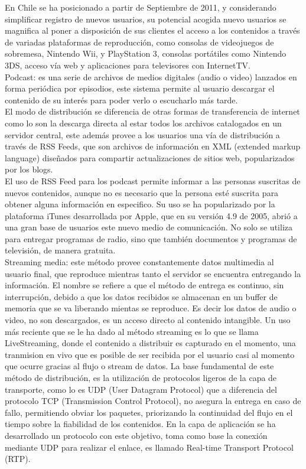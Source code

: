 En Chile se ha posicionado a partir de Septiembre de 2011, y considerando simplificar registro de nuevos usuarios, su potencial acogida nuevo usuarios se magnifica al poner a disposición de sus clientes el acceso a los contenidos a través de variadas plataformas de reproducción, como consolas de videojuegos de sobremesa, Nintendo Wii, y PlayStation 3, consolas portátiles como Nintendo 3DS, acceso vía web y aplicaciones para televisores con InternetTV. \\

Podcast: es una serie de archivos de medios digitales (audio o video) lanzados en forma periódica por episodios, este sistema permite al usuario descargar el contenido de su interés para poder verlo o escucharlo más tarde.\\

El modo de distribución se diferencia de otras formas de transferencia de internet como lo son la descarga directa al estar todos los archivos catalogados en un servidor central, este además provee a los usuarios una vía de distribución a través de RSS Feeds, que son archivos de información en XML (extended markup language) diseñados para compartir actualizaciones de sitios web, popularizados por los blogs.\\ 
El uso de RSS Feed para los podcast permite informar a las personas suscritas de nuevos contenidos, aunque no es necesario que la persona esté suscrita para obtener alguna información en especifico. 
Su uso se ha popularizado por la plataforma iTunes desarrollada por Apple, que en su versión 4.9 de 2005, abrió a una gran base de usuarios este nuevo medio de comunicación. No solo se utiliza para entregar programas de radio, sino que también documentos y programas de televisión, de manera gratuita.\\

Streaming media: este método provee constantemente datos multimedia al usuario final, que reproduce mientras tanto el servidor se encuentra entregando la información.
El nombre se refiere a que el método de entrega es continuo, sin interrupción, debido a que los datos recibidos se almacenan en un buffer de memoria que se va liberando mientas se reproduce. Es decir los datos de audio o video, no son descargados,  es un acceso directo al contenido intangible.
Un uso más reciente que se le ha dado al método streaming es lo que se llama LiveStreaming, donde el contenido a distribuir es capturado en el momento, una tranmision en vivo que es posible de ser recibida por el usuario casi al momento que ocurre gracias al flujo o stream de datos.
La base fundamental de este método de distribución, es la utilización de protocolos ligeros de la capa de transporte, como lo es UDP (User Datagram Protocol) que a diferencia del protocolo TCP (Transmission Control Protocol), no asegura la entrega en caso de fallo, permitiendo obviar los paquetes, priorizando la continuidad del flujo en el tiempo sobre la fiabilidad de los contenidos.  En la capa de aplicación se ha desarrollado un protocolo con este objetivo, toma como base la conexión mediante UDP para realizar el enlace, es llamado Real-time Transport Protocol (RTP).\\

